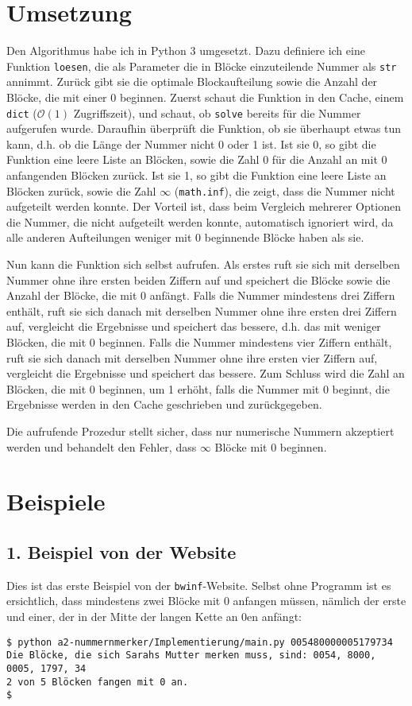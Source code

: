 \documentclass[a4paper,10pt,ngerman]{scrartcl}
\begin{document}
\section{Umsetzung}
Den Algorithmus habe ich in Python 3 umgesetzt.
Dazu definiere ich eine Funktion \texttt{loesen}, die als Parameter die in Blöcke einzuteilende Nummer als \texttt{str} annimmt.
Zurück gibt sie die optimale Blockaufteilung sowie die Anzahl der Blöcke, die mit einer 0 beginnen.
Zuerst schaut die Funktion in den Cache, einem \texttt{dict} ($\mathcal{O}(1)$ Zugriffszeit), und schaut, ob \texttt{solve} bereits für die Nummer aufgerufen wurde.
Daraufhin überprüft die Funktion, ob sie überhaupt etwas tun kann, d.h. ob die Länge der Nummer nicht 0 oder 1 ist.
Ist sie 0, so gibt die Funktion eine leere Liste an Blöcken, sowie die Zahl 0 für die Anzahl an mit 0 anfangenden Blöcken zurück.
Ist sie 1, so gibt die Funktion eine leere Liste an Blöcken zurück, sowie die Zahl $\infty$ (\texttt{math.inf}), die zeigt, dass die Nummer nicht aufgeteilt werden konnte.
Der Vorteil ist, dass beim Vergleich mehrerer Optionen die Nummer, die nicht aufgeteilt werden konnte, automatisch ignoriert wird, da alle anderen Aufteilungen weniger mit 0 beginnende Blöcke haben als sie.

Nun kann die Funktion sich selbst aufrufen.
Als erstes ruft sie sich mit derselben Nummer ohne ihre ersten beiden Ziffern auf und speichert die Blöcke sowie die Anzahl der Blöcke, die mit 0 anfängt.
Falls die Nummer mindestens drei Ziffern enthält, ruft sie sich danach mit derselben Nummer ohne ihre ersten drei Ziffern auf, vergleicht die Ergebnisse und speichert das bessere, d.h. das mit weniger Blöcken, die mit 0 beginnen.
Falls die Nummer mindestens vier Ziffern enthält, ruft sie sich danach mit derselben Nummer ohne ihre ersten vier Ziffern auf, vergleicht die Ergebnisse und speichert das bessere.
Zum Schluss wird die Zahl an Blöcken, die mit 0 beginnen, um 1 erhöht, falls die Nummer mit 0 beginnt, die Ergebnisse werden in den Cache geschrieben und zurückgegeben.

Die aufrufende Prozedur stellt sicher, dass nur numerische Nummern akzeptiert werden und behandelt den Fehler, dass $\infty$ Blöcke mit 0 beginnen.

\section{Beispiele}
\subsection{1. Beispiel von der Website}
Dies ist das erste Beispiel von der \texttt{bwinf}-Website.
Selbst ohne Programm ist es ersichtlich, dass mindestens zwei Blöcke mit 0 anfangen müssen, nämlich der erste und einer, der in der Mitte der langen Kette an 0en anfängt:
\begin{lstlisting}
$ python a2-nummernmerker/Implementierung/main.py 005480000005179734
Die Blöcke, die sich Sarahs Mutter merken muss, sind: 0054, 8000, 0005, 1797, 34
2 von 5 Blöcken fangen mit 0 an.
$ 
\end{lstlisting}
\end{document}
